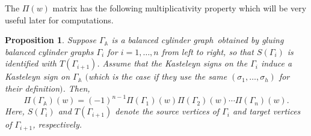 \documentclass[pdftex]{sigma}
\numberwithin{equation}{section}
\newtheorem{Proposition}[Theorem]{Proposition}
 { \theoremstyle{definition}
\newtheorem{Definition}[Theorem]{Definition}
\newtheorem{Note}[Theorem]{Note}
\newtheorem{Example}[Theorem]{Example}
\newtheorem{Remark}[Theorem]{Remark} }
\newcommand{\bcg}{{balanced cylinder graph}}
\newcommand{\A}{{\mathbb A}}
\newcommand{\la}{\label}
\begin{document}
	The $\Pi(w)$ matrix has the following multiplicativity property which will be very useful later for computations.
	
	\begin{Proposition}\la{prop:prod}
		Suppose $\Gamma_\A$ is a \bcg\ obtained by gluing \bcg s $\Gamma_i$ for $i=1, \dots, n$ from left to right, so that $S(\Gamma_i)$ is identified with $T(\Gamma_{i+1})$. Assume that the Kasteleyn signs on the $\Gamma_i$ induce a Kasteleyn sign on $\Gamma_\A$ $($which is the case if they use the same $(\sigma_1,\dots,\sigma_h)$ for their definition$)$. Then,
		\[
		\Pi(\Gamma_\A)(w)=(-1)^{n-1}\Pi(\Gamma_1)(w) \Pi(\Gamma_{2})(w) \cdots \Pi(\Gamma_n)(w).
		\]
		Here, $S(\Gamma_i)$ and $T(\Gamma_{i+1})$ denote the source vertices of $\Gamma_i$ and target vertices of $\Gamma_{i+1}$, respectively.
	\end{Proposition}
	
\end{document}
